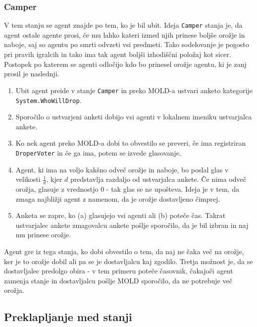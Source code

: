 \documentclass[a4paper,10pt]{article}
\begin{document}
\subsubsection{Camper} \label{sec:states-camper}
V tem stanju se agent znajde po tem, ko je bil ubit. Ideja \verb+Camper+ stanja je, da agent ostale agente prosi, če mu lahko kateri izmed njih prinese boljše 
orožje in naboje, saj so agentu po smrti odvzeti vsi predmeti. Tako sodelovanje je pogosto pri pravih igralcih in tako ima tak agent boljši izhodiščni položaj 
kot sicer.\\
Postopek po katerem se agenti odločijo kdo bo prinesel orožje agentu, ki je zanj prosil je naslednji.
\begin{enumerate}
 \item Ubit agent preide v stanje \verb+Camper+ in preko MOLD-a ustvari anketo kategorije \verb+System.WhoWillDrop+.
 \item Sporočilo o ustvarjeni anketi dobijo vsi agenti v lokalnem imeniku ustvarjalca ankete.
 \item Ko nek agent preko MOLD-a dobi to obvestilo se preveri, če ima registriran \verb+DroperVoter+ in če
       ga ima, potem se izvede glasovanje. 
 \item Agent, ki ima na voljo kakšno odveč orožje in naboje, bo poslal glas v velikosti $\frac{1}{d}$, kjer $d$ predstavlja razdaljo od ustvarjalca ankete. 
       Če nima odveč orožja, glasuje z vrednostjo 0 - tak glas se ne upošteva. Ideja je v tem, da zmaga najbližji agent z namenom, da je orožje 
       dostavljeno čimprej.
 \item Anketa se zapre, ko (a) glasujejo vsi agenti ali (b) poteče čas. Takrat ustvarjalec ankete zmagovalcu ankete pošlje sporočilo, da je bil izbran in naj 
       mu prinese orožje.
\end{enumerate}
Agent gre iz tega stanja, ko dobi obvestilo o tem, da naj ne čaka več na orožje, ker je to orožje dobil ali pa se je dostavljalcu kaj zgodilo.
Tretja možnost je, da se dostavljalec predolgo obira - v tem primeru poteče časovnik, čakajoči agent zamenja stanje in dostavljalcu pošlje MOLD sporočilo,
da ne potrebuje več orožja.

\subsection{Preklapljanje med stanji}
\end{document}
